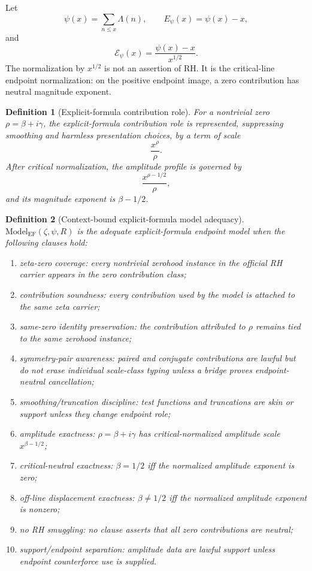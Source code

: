 \documentclass[11pt]{article}
\newtheorem{definition}{Definition}[section]
\newcommand{\ModelEF}{\mathrm{Model}_{\mathrm{EF}}}
\newcommand{\psierr}{E_{\psi}}
\newcommand{\psinorm}{\mathcal E_{\psi}}
\begin{document}
Let
\[
\psi(x)=\sum_{n\le x}\Lambda(n),\qquad \psierr(x)=\psi(x)-x,
\]
and
\[
\psinorm(x)=\frac{\psi(x)-x}{x^{1/2}}.
\]
The normalization by \(x^{1/2}\) is not an assertion of RH.  It is the critical-line endpoint normalization: on the positive endpoint image, a zero contribution has neutral magnitude exponent.

\begin{definition}[Explicit-formula contribution role]
For a nontrivial zero \(\rho=\beta+i\gamma\), the explicit-formula contribution role is represented, suppressing smoothing and harmless presentation choices, by a term of scale
\[
\frac{x^\rho}{\rho}.
\]
After critical normalization, the amplitude profile is governed by
\[
\frac{x^{\rho-1/2}}{\rho},
\]
and its magnitude exponent is \(\beta-1/2\).
\end{definition}

\begin{definition}[Context-bound explicit-formula model adequacy]
\(\ModelEF(\zeta,\psi,R)\) is the adequate explicit-formula endpoint model when the following clauses hold:
\begin{enumerate}[label=(EF\arabic*)]
\item zeta-zero coverage: every nontrivial zerohood instance in the official RH carrier appears in the zero contribution class;
\item contribution soundness: every contribution used by the model is attached to the same zeta carrier;
\item same-zero identity preservation: the contribution attributed to \(\rho\) remains tied to the same zerohood instance;
\item symmetry-pair awareness: paired and conjugate contributions are lawful but do not erase individual scale-class typing unless a bridge proves endpoint-neutral cancellation;
\item smoothing/truncation discipline: test functions and truncations are skin or support unless they change endpoint role;
\item amplitude exactness: \(\rho=\beta+i\gamma\) has critical-normalized amplitude scale \(x^{\beta-1/2}\);
\item critical-neutral exactness: \(\beta=1/2\) iff the normalized amplitude exponent is zero;
\item off-line displacement exactness: \(\beta\ne 1/2\) iff the normalized amplitude exponent is nonzero;
\item no RH smuggling: no clause asserts that all zero contributions are neutral;
\item support/endpoint separation: amplitude data are lawful support unless endpoint counterforce use is supplied.
\end{enumerate}
\end{definition}
\end{document}
